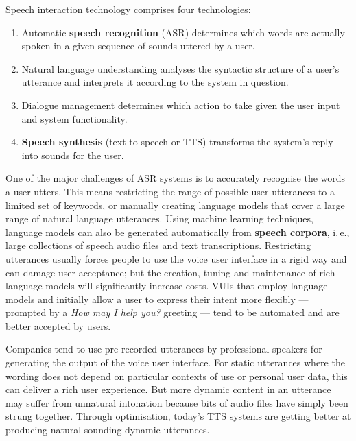 \documentclass[]{../../metanetpaper}
\begin{document}
\begin{multicols}{2}
Speech interaction technology comprises four technologies: 

\begin{enumerate}
\item Automatic \textbf{speech recognition} (ASR) determines which words are actually spoken in a given sequence of sounds uttered by a user.  
\item Natural language understanding analyses the syntactic structure of a user’s utterance and interprets it according to the system in question.
\item Dialogue management determines which action to take given the user input and system functionality.   
\item \textbf{Speech synthesis} (text-to-speech or TTS) transforms the system’s reply into sounds for the user.
\end{enumerate}

One of the major challenges of ASR systems is to accurately recognise the words a user utters. This means restricting the range of possible user utterances to a limited set of keywords, or manually creating language models that cover a large range of natural language utterances. Using machine learning techniques, language models can also be generated automatically from \textbf{speech corpora}, i.\,e., large collections of speech audio files and text transcriptions. Restricting utterances usually forces people to use the voice user interface in a rigid way and can damage user acceptance; but the creation, tuning and maintenance of rich language models will significantly increase costs. VUIs that employ language models and initially allow a user to express their intent more flexibly — prompted by a \textit{How may I help you?} greeting — tend to be automated and are better accepted by users.


Companies tend to use pre-recorded utterances by professional speakers for generating the output of the voice user interface. For static utterances where the wording does not depend on particular contexts of use or personal user data, this can deliver a rich user experience. But more dynamic content in an utterance may suffer from unnatural intonation because bits of audio files have simply been strung together. Through optimisation, today’s TTS systems are getting better at producing natural-sounding dynamic utterances.


\end{multicols}
\end{document}
